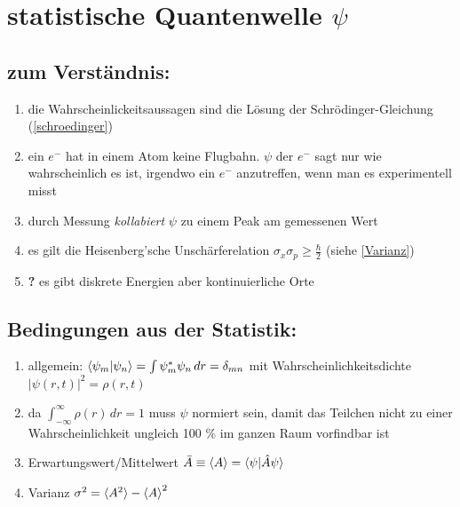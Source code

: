 \section{statistische Quantenwelle $\psi$}

\subsection{zum Verständnis:}
\begin{enumerate}
    \item die Wahrscheinlickeitsaussagen sind die Lösung der Schrödinger-Gleichung (\ref{schroedinger})
    \item ein $e^-$ hat in einem Atom keine Flugbahn. $\psi$ der $e^-$ sagt nur wie wahrscheinlich es ist,
    irgendwo ein $e^-$  anzutreffen, wenn man es experimentell misst
    \item durch Messung \textit{kollabiert} $\psi$ zu einem Peak am gemessenen Wert 
    \item es gilt die Heisenberg'sche Unschärferelation $\sigma_x\sigma_p\geq\frac{\hbar}{2}$ (siehe \ref{Varianz})
    \item \textbf{?} es gibt diskrete Energien aber kontinuierliche Orte 
\end{enumerate}

\subsection{Bedingungen aus der Statistik:}
\begin{enumerate}
    \item allgemein: $\braket{\psi_m|\psi_n}=\int \psi_m^*\psi_n \,dr=\delta_{mn}$ mit Wahrscheinlichkeitsdichte $|\psi(r,t)|^2=\rho(r,t)$
    \item da $\int_{-\infty}^{\infty} \rho(r) \,dr=1$ muss $\psi$ normiert sein, damit 
    das Teilchen nicht zu einer Wahrscheinlichkeit ungleich 100 $\%$ im ganzen Raum vorfindbar ist
    \item Erwartungswert/Mittelwert $\bar{A}\equiv\braket{A}=\braket{\psi|\hat{A}\psi}$
    \item Varianz $\sigma^2=\braket{A^2}-\braket{A}^2$ \label{Varianz}
\end{enumerate}

